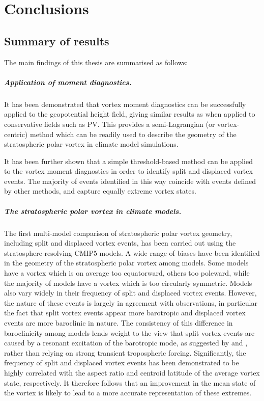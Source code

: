 \chapter{Conclusions}
\label{cha:conclusions}

\section{Summary of results}

The main findings of this thesis are summarised as follows: 

\paragraph{Application of moment diagnostics.} It has been demonstrated that
vortex moment diagnostics can be successfully applied to the geopotential height
field, giving similar results as when applied to conservative fields such as
PV. This provides a semi-Lagrangian (or vortex-centric) method which can be
readily used to describe the geometry of the stratospheric polar vortex in
climate model simulations.

It has been further shown that a simple threshold-based method can be applied to
the vortex moment diagnostics in order to identify split and displaced vortex
events. The majority of events identified in this way coincide with events
defined by other methods, and capture equally extreme vortex states.

\paragraph{The stratospheric polar vortex in climate models.} The first
multi-model comparison of stratospheric polar vortex geometry, including split
and displaced vortex events, has been carried out using the
stratosphere-resolving CMIP5 models. A wide range of biases have been identified
in the geometry of the stratospheric polar vortex among models. Some models have
a vortex which is on average too equatorward, others too poleward, while the
majority of models have a vortex which is too circularly symmetric. Models also
vary widely in their frequency of split and displaced vortex events. However,
the nature of these events is largely in agreement with observations, in
particular the fact that split vortex events appear more barotropic and
displaced vortex events are more baroclinic in nature. The consistency of this
difference in baroclinicity among models lends weight to the view that split
vortex events are caused by a resonant excitation of the barotropic mode, as
suggested by \citet{Esler2005} and \citet{Matthewman2011}, rather than relying
on strong transient tropospheric forcing. Significantly, the frequency of split
and displaced vortex events has been demonstrated to be highly correlated with
the aspect ratio and centroid latitude of the average vortex state,
respectively. It therefore follows that an improvement in the mean state of the
vortex is likely to lead to a more accurate representation of these extremes.

